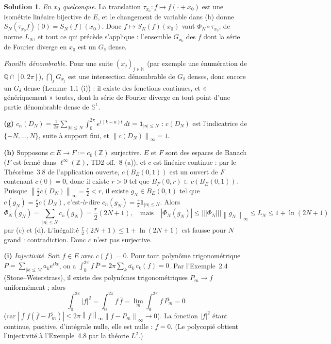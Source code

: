 \documentclass[11pt,a4paper]{article}
\newcommand{\N}{\mathbb{N}}
\newcommand{\Z}{\mathbb{Z}}
\newcommand{\Q}{\mathbb{Q}}
\newcommand{\norm}[1]{\left\|#1\right\|}
\newcommand{\opnorm}[1]{|\!|\!|#1|\!|\!|}
\newcommand{\Sun}{\mathbb{S}^1}
\theoremstyle{definition}
\newtheorem*{solution}{Solution}
\begin{document}
\begin{solution}
\emph{En $x_0$ quelconque.} La translation $\tau_{x_0}:f\mapsto f(\cdot+x_0)$ est une isométrie linéaire bijective de $E$, et le changement de variable dans (b) donne $S_N(\tau_{x_0}f)(0)=S_N(f)(x_0)$. Donc $f\mapsto S_N(f)(x_0)$ vaut $\Phi_N\circ\tau_{x_0}$, de norme $L_N$, et tout ce qui précède s'applique : l'ensemble $G_{x_0}$ des $f$ dont la série de Fourier diverge en $x_0$ est un $G_\delta$ dense.

\emph{Famille dénombrable.} Pour une suite $(x_j)_{j\in\N}$ (par exemple une énumération de $\Q\cap[0,2\pi]$), $\bigcap_jG_{x_j}$ est une intersection dénombrable de $G_\delta$ denses, donc encore un $G_\delta$ dense (Lemme~1.1 (i)) : il existe des fonctions continues, et « génériquement » toutes, dont la série de Fourier diverge en tout point d'une partie dénombrable dense de $\Sun$.

\medskip
\noindent\textbf{(g)} $c_n(D_N)=\frac1{2\pi}\sum_{|k|\le N}\int_0^{2\pi}e^{i(k-n)t}\,dt=\mathbf 1_{|n|\le N}$ : $c(D_N)$ est l'indicatrice de $\{-N,\dots,N\}$, suite à support fini, et $\norm{c(D_N)}_\infty=1$.

\medskip
\noindent\textbf{(h)} Supposons $c:E\to F:=c_0(\Z)$ surjective. $E$ et $F$ sont des espaces de Banach ($F$ est fermé dans $\ell^\infty(\Z)$, TD2 off.~8 (a)), et $c$ est linéaire continue : par le Théorème~3.8 de l'application ouverte, $c(B_E(0,1))$ est un ouvert de $F$ contenant $c(0)=0$, donc il existe $r>0$ tel que $B_F(0,r)\subset c(B_E(0,1))$. Puisque $\norm{\frac r2c(D_N)}_\infty=\frac r2<r$, il existe $g_N\in B_E(0,1)$ tel que $c(g_N)=\frac r2c(D_N)$, c'est-à-dire $c_n(g_N)=\frac r2\mathbf 1_{|n|\le N}$. Alors
\[
\Phi_N(g_N)=\sum_{|n|\le N}c_n(g_N)=\frac r2(2N+1),
\quad\text{mais}\quad
|\Phi_N(g_N)|\le\opnorm{\Phi_N}\norm{g_N}_\infty\le L_N\le1+\ln(2N+1)
\]
par (c) et (d). L'inégalité $\frac r2(2N+1)\le1+\ln(2N+1)$ est fausse pour $N$ grand : contradiction. Donc $c$ n'est pas surjective.

\medskip
\noindent\textbf{(i)} \emph{Injectivité.} Soit $f\in E$ avec $c(f)=0$. Pour tout polynôme trigonométrique $P=\sum_{|k|\le M}a_ke^{ikt}$, on a $\int_0^{2\pi}f\,\overline P=2\pi\sum_k\overline{a_k}\,c_k(f)=0$. Par l'Exemple~2.4 (Stone--Weierstrass), il existe des polynômes trigonométriques $P_m\to f$ uniformément ; alors
\[
\int_0^{2\pi}|f|^2=\int_0^{2\pi}f\,\overline f=\lim_m\int_0^{2\pi}f\,\overline{P_m}=0
\]
(car $|\int f(\overline f-\overline{P_m})|\le2\pi\norm f_\infty\norm{f-P_m}_\infty\to0$). La fonction $|f|^2$ étant continue, positive, d'intégrale nulle, elle est nulle : $f=0$. (Le polycopié obtient l'injectivité à l'Exemple~4.8 par la théorie $L^2$.)


\end{solution}
\end{document}
